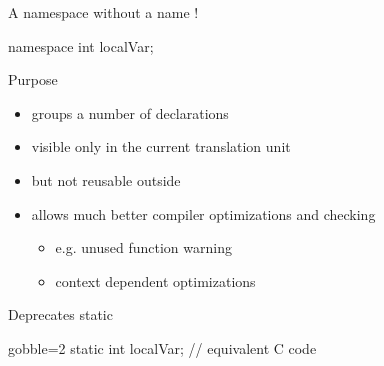 \begin{frame}[fragile]
  \begin{exampleblock}{A namespace without a name !}
    \begin{cppcode*}{}
      namespace {
        int localVar;
      }
    \end{cppcode*}
  \end{exampleblock}
  \begin{block}{Purpose}
    \begin{itemize}
    \item groups a number of declarations
    \item visible only in the current translation unit
    \item but not reusable outside
    \item allows much better compiler optimizations and checking
      \begin{itemize}
      \item e.g. unused function warning
      \item context dependent optimizations
      \end{itemize}
    \end{itemize}
  \end{block}
  \begin{alertblock}{Deprecates static}
    \begin{cppcode*}{gobble=2}
      static int localVar; // equivalent C code
    \end{cppcode*}
  \end{alertblock}
\end{frame}
